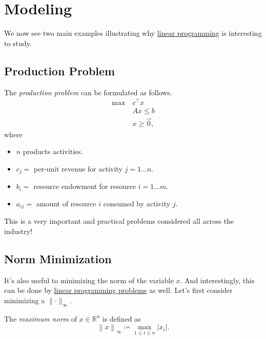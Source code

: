 \section{Modeling}
We now see two main examples illustrating why \hyperref[def:general-linear-programming-problem]{linear programming} is interesting to study.

\subsection{Production Problem}\label{subsec:production-problem}
The \emph{production problem} can be formulated as follows.
\[
	\begin{aligned}
		\max~ & c^{\top}x      \\
		      & Ax \leq b      \\
		      & x\geq \vec{0},
	\end{aligned}
\]
where
\begin{itemize}
	\item \(n\) products activities.
	\item \(c_{j}=\) per-unit revenue for activity \(j = 1\dots n\).
	\item \(b_{i}=\) resource endowment for resource \(i = 1\dots m\).
	\item \(a_{ij}=\) amount of resource \(i\) consumed by activity \(j\).
\end{itemize}

\begin{note}
	This is a very important and practical problems considered all across the industry!
\end{note}

\subsection{Norm Minimization}
It's also useful to minimizing the norm of the variable \(x\). And interestingly, this can be done by \hyperref[def:general-linear-programming-problem]{linear programming problems} as well. Let's first consider minimizing a \(\lVert \cdot \rVert _\infty \).

\begin{definition}\label{def:maximum-norm}
	The \emph{maximum norm} of \(x\in \mathbb{R} ^n\) is defined as
	\[
		\left\lVert x\right\rVert _{\infty } \coloneqq \max_{1\leq i \leq n} \vert x_i \vert .
	\]
\end{definition}

